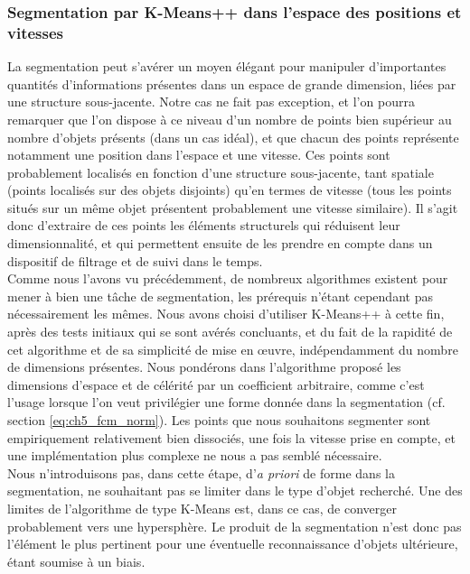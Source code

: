 \subsubsection{Segmentation par K-Means++ dans l'espace des positions et vitesses} \label{sec:ch5_segmentation}
La segmentation peut s'avérer un moyen élégant pour manipuler d'importantes quantités d'informations présentes dans un espace de grande dimension, liées par une structure sous-jacente. Notre cas ne fait pas exception, et l'on pourra remarquer que l'on dispose à ce niveau d'un nombre de points bien supérieur au nombre d'objets présents (dans un cas idéal), et que chacun des points représente notamment une position dans l'espace et une vitesse. Ces points sont probablement localisés en fonction d'une structure sous-jacente, tant spatiale (points localisés sur des objets disjoints) qu'en termes de vitesse (tous les points situés sur un même objet présentent probablement une vitesse similaire). Il s'agit donc d'extraire de ces points les éléments structurels qui réduisent leur dimensionnalité, et qui permettent ensuite de les prendre en compte dans un dispositif de filtrage et de suivi dans le temps.\\

Comme nous l'avons vu précédemment, de nombreux algorithmes existent pour mener à bien une tâche de segmentation, les prérequis n'étant cependant pas nécessairement les mêmes. Nous avons choisi d'utiliser K-Means++ à cette fin, après des tests initiaux qui se sont avérés concluants, et du fait de la rapidité de cet algorithme et de sa simplicité de mise en œuvre, indépendamment du nombre de dimensions présentes. Nous pondérons dans l'algorithme proposé les dimensions d'espace et de célérité par un coefficient arbitraire, comme c'est l'usage lorsque l'on veut privilégier une forme donnée dans la segmentation (cf. section \ref{eq:ch5_fcm_norm}). Les points que nous souhaitons segmenter sont empiriquement relativement bien dissociés, une fois la vitesse prise en compte, et une implémentation plus complexe ne nous a pas semblé nécessaire. \\

Nous n'introduisons pas, dans cette étape, d'\textit{a priori} de forme dans la segmentation, ne souhaitant pas se limiter dans le type d'objet recherché. Une des limites de l'algorithme de type K-Means est, dans ce cas, de converger probablement vers une hypersphère. Le produit de la segmentation n'est donc pas l'élément le plus pertinent pour une éventuelle reconnaissance d'objets ultérieure, étant soumise à un biais.

